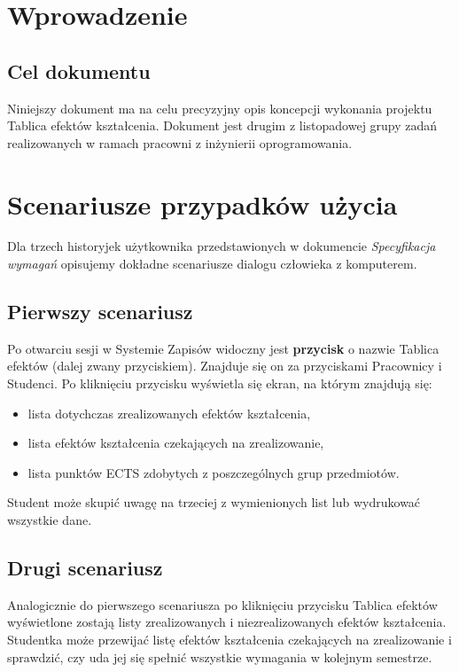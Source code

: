 \documentclass{article}
\begin{document}
\section{Wprowadzenie}

\subsection{Cel dokumentu}
Niniejszy dokument ma na celu precyzyjny opis koncepcji wykonania projektu Tablica efektów kształcenia.
Dokument jest drugim z listopadowej grupy zadań realizowanych w ramach pracowni z inżynierii oprogramowania.

\section{Scenariusze przypadków użycia}
Dla trzech historyjek użytkownika przedstawionych w dokumencie \textit{Specyfikacja wymagań} opisujemy dokładne scenariusze dialogu człowieka z komputerem.

\subsection{Pierwszy scenariusz}
Po otwarciu sesji w Systemie Zapisów widoczny jest \textbf{przycisk} o nazwie Tablica efektów (dalej zwany przyciskiem). 
Znajduje się on za przyciskami \textsf{Pracownicy} i \textsf{Studenci}. Po kliknięciu przycisku wyświetla się ekran, na którym znajdują się:
\begin{itemize}
	\item lista dotychczas zrealizowanych efektów kształcenia,
	\item lista efektów kształcenia czekających na zrealizowanie,
	\item lista punktów ECTS zdobytych z poszczególnych grup przedmiotów.
\end{itemize}
Student może skupić uwagę na trzeciej z wymienionych list lub wydrukować wszystkie dane.

\subsection{Drugi scenariusz}
Analogicznie do pierwszego scenariusza po kliknięciu przycisku Tablica efektów wyświetlone zostają listy zrealizowanych i niezrealizowanych efektów kształcenia.
Studentka może przewijać listę efektów kształcenia czekających na zrealizowanie i sprawdzić, czy uda jej się spełnić wszystkie wymagania w kolejnym semestrze.
\end{document}
